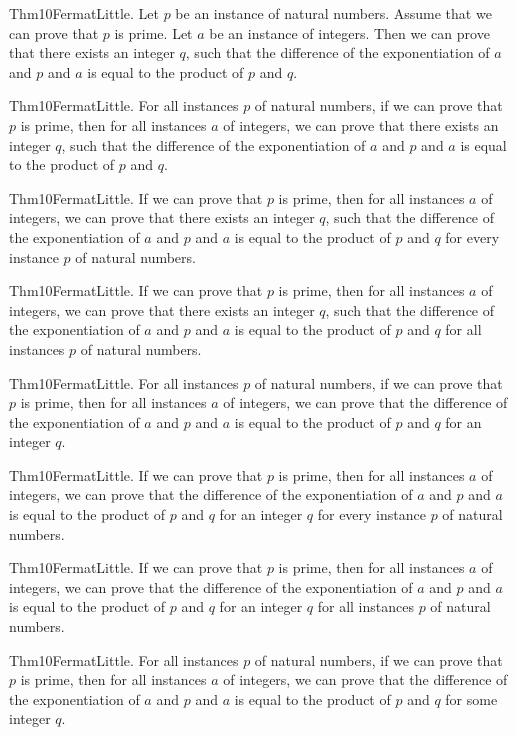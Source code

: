 \documentclass{article}
\begin{document}
Thm10FermatLittle. Let $p$ be an instance of natural numbers. Assume that we can prove that $p$ is prime. Let $a$ be an instance of integers. Then we can prove that there exists an integer $q$, such that the difference of the exponentiation of $a$ and $p$ and $a$ is equal to the product of $p$ and $q$.

Thm10FermatLittle. For all instances $p$ of natural numbers, if we can prove that $p$ is prime, then for all instances $a$ of integers, we can prove that there exists an integer $q$, such that the difference of the exponentiation of $a$ and $p$ and $a$ is equal to the product of $p$ and $q$.

Thm10FermatLittle. If we can prove that $p$ is prime, then for all instances $a$ of integers, we can prove that there exists an integer $q$, such that the difference of the exponentiation of $a$ and $p$ and $a$ is equal to the product of $p$ and $q$ for every instance $p$ of natural numbers.

Thm10FermatLittle. If we can prove that $p$ is prime, then for all instances $a$ of integers, we can prove that there exists an integer $q$, such that the difference of the exponentiation of $a$ and $p$ and $a$ is equal to the product of $p$ and $q$ for all instances $p$ of natural numbers.

Thm10FermatLittle. For all instances $p$ of natural numbers, if we can prove that $p$ is prime, then for all instances $a$ of integers, we can prove that the difference of the exponentiation of $a$ and $p$ and $a$ is equal to the product of $p$ and $q$ for an integer $q$.

Thm10FermatLittle. If we can prove that $p$ is prime, then for all instances $a$ of integers, we can prove that the difference of the exponentiation of $a$ and $p$ and $a$ is equal to the product of $p$ and $q$ for an integer $q$ for every instance $p$ of natural numbers.

Thm10FermatLittle. If we can prove that $p$ is prime, then for all instances $a$ of integers, we can prove that the difference of the exponentiation of $a$ and $p$ and $a$ is equal to the product of $p$ and $q$ for an integer $q$ for all instances $p$ of natural numbers.

Thm10FermatLittle. For all instances $p$ of natural numbers, if we can prove that $p$ is prime, then for all instances $a$ of integers, we can prove that the difference of the exponentiation of $a$ and $p$ and $a$ is equal to the product of $p$ and $q$ for some integer $q$.
\end{document}
